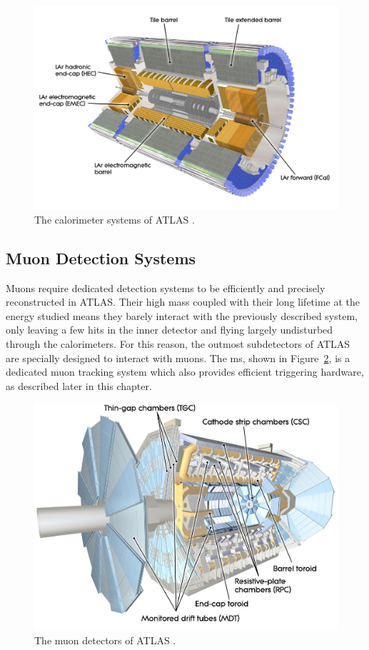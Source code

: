 \begin{figure}[!h]
  \centering
  \includegraphics[width=\textwidth]{Images/ATLAS/ATLASCalo.jpg}
  \caption{The calorimeter systems of ATLAS \cite{ATLASschematics}.}
  \label{fig-AtlasDecCalo}
\end{figure}

\subsection{Muon Detection Systems}
Muons require dedicated detection systems to be efficiently and precisely reconstructed in ATLAS. Their high mass coupled with their long lifetime at the energy studied means they barely interact with the previously described system, only leaving a few hits in the inner detector and flying largely undisturbed through the calorimeters. For this reason, the outmost subdetectors of ATLAS are specially designed to interact with muons. The \gls{ms}, shown in Figure~\ref{fig-AtlasDecMuon}, is a dedicated muon tracking system which also provides efficient triggering hardware, as described later in this chapter. 

\begin{figure}[!h]
  \centering
  \includegraphics[width=\textwidth]{Images/ATLAS/ATLASMuon.jpg}
  \caption{The muon detectors of ATLAS \cite{ATLASschematics}.}
  \label{fig-AtlasDecMuon}
\end{figure}

